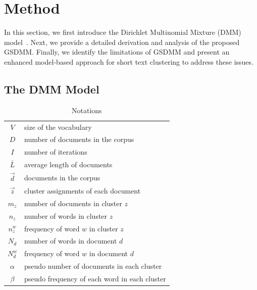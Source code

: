 \section{Method} \label{method}
In this section, we first introduce the Dirichlet Multinomial Mixture (DMM) model~\cite{nigam2000text}. Next, we provide a detailed derivation and analysis of the proposed GSDMM. Finally, we identify the limitations of GSDMM and present an enhanced model-based approach for short text clustering to address these issues.

\subsection{The DMM Model}

\begin{table}
\caption{Notations}
\centering
\begin{tabular}{cl}
  \hline
  $V$ & size of the vocabulary \\
  $D$ & number of documents in the corpus \\
  $I$ & number of iterations \\
  $\bar{L}$ & average length of documents \\
  $\vec{d}$  & documents in the corpus\\
  $\vec{z}$  & cluster assignments of each document \\
  $m_z$ & number of documents in cluster $z$ \\
  $n_z$ & number of words in cluster $z$ \\
  $n_z^{w}$   & frequency of word $w$ in cluster $z$ \\
  $N_d$   & number of words in document $d$ \\
  $N_d^{w}$   & frequency of word $w$ in document $d$ \\
  $\alpha$ & pseudo number of documents in each cluster \\
  $\beta$ & pseudo frequency of each word in each cluster \\
  \hline
\end{tabular}
\label{tab:Notations}
\end{table}


